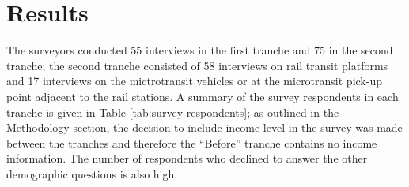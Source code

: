 \documentclass[smartcities,article,submit,moreauthors,pdftex]{Definitions/mdpi}
\begin{document}
\section{Results}

The surveyors conducted 55 interviews in the first tranche and 75 in the second tranche; the second tranche consisted of 58 interviews on rail transit platforms and 17 interviews on the mictrotransit vehicles or at the microtransit pick-up point adjacent to the rail stations. A summary of the survey respondents in each tranche is given in Table \ref{tab:survey-respondents}; as outlined in the Methodology section, the decision to include income level in the survey was made between the tranches and therefore the “Before” tranche contains no income information. The number of respondents who declined to answer the other demographic questions is also high.
\end{document}

